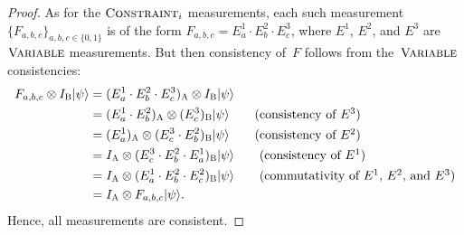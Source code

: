 \documentclass[11pt]{article}
\theoremstyle{definition}
\newcommand{\ket}[1]{|#1\rangle}
\newcommand{\labelstyle}[1]{\ensuremath{\textsc{#1}}\xspace}
\newcommand{\alice}{\labelstyle{A}}
\newcommand{\bob}{\labelstyle{B}}
\newcommand{\typestyle}[1]{\ensuremath{\textsc{#1}}\xspace}
\newcommand{\Constraint}{\typestyle{Constraint}}
\newcommand{\Variable}{\typestyle{Variable}}
\begin{document}
\begin{proof}
  As for the $\Constraint_i$ measurements, each such measurement $\{F_{a, b,
    c}\}_{a, b, c \in \{0, 1\}}$ is of the form $F_{a, b, c} = E^1_a \cdot E^2_b
  \cdot E^3_c$, where $E^1$, $E^2$, and $E^3$ are $\Variable$ measurements.
  But then consistency of~$F$ follows from the~$\Variable$ consistencies:
  \begin{align*}
  F_{a, b, c} \otimes I_{\bob} \ket{\psi}
 & = (E^1_a \cdot E^2_b \cdot E^3_c)_{\alice} \otimes I_{\bob} \ket{\psi}\\
 & = (E^1_a \cdot E^2_b)_{\alice} \otimes (E^3_c)_{\bob} \ket{\psi} \tag{consistency of $E^3$}\\
 &   = (E^1_a)_{\alice} \otimes (E^3_c \cdot E^2_b)_{\bob} \ket{\psi}\tag{consistency of $E^2$}\\
 &       = I_{\alice} \otimes (E^3_c \cdot E^2_b \cdot E^1_a)_{\bob} \ket{\psi}\tag{consistency of $E^1$}\\
 &       = I_{\alice} \otimes (E^1_a \cdot E^2_b \cdot E^2_c)_{\bob} \ket{\psi}\tag{commutativity of $E^1$, $E^2$, and $E^3$}\\
 &               = I_{\alice} \otimes F_{a, b,c} \ket{\psi}.
  \end{align*}
  Hence, all measurements are consistent.
  

\end{proof}
\end{document}
